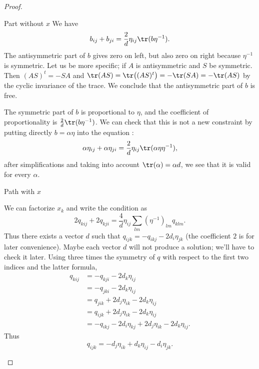 \begin{proof}
    \begin{subproof}
    \item[Part without \( x\)]
        We have 
        \begin{equation}
            b_{ij}+b_{ji}=\frac{ 2 }{ d }\eta_{ij}\tr(b\eta^{-1}).
        \end{equation}
        The antisymmetric part of \( b\) gives zero on left, but also zero on right because \( \eta^{-1}\) is symmetric. Let us be more specific; if \( A\) is antisymmetric and \( S\) be symmetric. Then \( (AS)^t=-SA\) and \( \tr(AS)=\tr\big( (AS)^t \big)=-\tr(SA)=-\tr(AS)\) by the cyclic invariance of the trace. We conclude that the antisymmetric part of \( b\) is free.

        The symmetric part of \( b\) is proportional to \( \eta\), and the coefficient of proportionality is \( \frac{ 2 }{ d }\tr(b\eta^{-1})\). We can check that this is not a new constraint by putting directly \( b=\alpha\eta\) into the equation :
        \begin{equation}
            \alpha\eta_{ij}+\alpha\eta_{ji}=\frac{ 2 }{ d }\eta_{ij}\tr(\alpha\eta\eta^{-1}),
        \end{equation}
        after simplifications and taking into account \( \tr(\alpha)=\alpha d\), we see that it is valid for every \( \alpha\).
    \item[Path with \( x\)]

        We can factorize \( x_k\) and write the condition as
        \begin{equation}
            2q_{kij}+2q_{kji}=\frac{ 4 }{ d }\eta_{ij}\sum_{lm}(\eta^{-1})_{lm}q_{klm}.
        \end{equation}
        Thus there exists a vector \( d\) such that \( q_{ijk}=-q_{ikj}-2d_i\eta_{jk}\) (the coefficient \( 2\) is for later convenience). Maybe each vector \( d\) will not produce a solution; we'll have to check it later. Using three times the symmetry of \( q\) with respect to the first two indices and the latter formula,
        \begin{subequations}        
            \begin{align}
                q_{kij}&=-q_{kji}-2d_k\eta_{ij}\\
                &=-q_{jki}-2d_k\eta_{ij}\\
                &=q_{jik}+2d_j\eta_{ik}-2d_k\eta_{ij}\\
                &=q_{ijk}+2d_j\eta_{ik}-2d_k\eta_{ij}\\
                &=-q_{ikj}-2d_i\eta_{kj}+2d_j\eta_{ik}-2d_k\eta_{ij}.
            \end{align}
        \end{subequations}
        Thus 
        \begin{equation}    \label{EQooKZVTooWSMmyM}
            q_{ijk}=-d_j\eta_{ik}+d_k\eta_{ij}-d_i\eta_{jk}.
        \end{equation}
    \end{subproof}
    

\end{proof}
